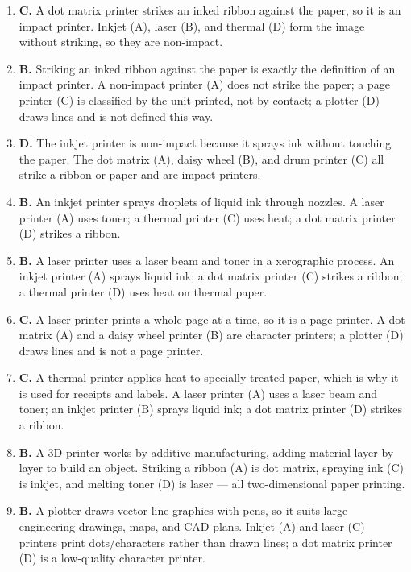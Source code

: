 \begin{enumerate}[label=\textbf{Q\arabic*.}, leftmargin=*]
\item \textbf{C.} A dot matrix printer strikes an inked ribbon against the
  paper, so it is an impact printer. Inkjet (A), laser (B), and thermal (D)
  form the image without striking, so they are non-impact.
\item \textbf{B.} Striking an inked ribbon against the paper is exactly the
  definition of an impact printer. A non-impact printer (A) does not strike
  the paper; a page printer (C) is classified by the unit printed, not by
  contact; a plotter (D) draws lines and is not defined this way.
\item \textbf{D.} The inkjet printer is non-impact because it sprays ink
  without touching the paper. The dot matrix (A), daisy wheel (B), and drum
  printer (C) all strike a ribbon or paper and are impact printers.
\item \textbf{B.} An inkjet printer sprays droplets of liquid ink through
  nozzles. A laser printer (A) uses toner; a thermal printer (C) uses heat;
  a dot matrix printer (D) strikes a ribbon.
\item \textbf{B.} A laser printer uses a laser beam and toner in a
  xerographic process. An inkjet printer (A) sprays liquid ink; a dot matrix
  printer (C) strikes a ribbon; a thermal printer (D) uses heat on thermal
  paper.
\item \textbf{C.} A laser printer prints a whole page at a time, so it is a
  page printer. A dot matrix (A) and a daisy wheel printer (B) are character
  printers; a plotter (D) draws lines and is not a page printer.
\item \textbf{C.} A thermal printer applies heat to specially treated paper,
  which is why it is used for receipts and labels. A laser printer (A) uses
  a laser beam and toner; an inkjet printer (B) sprays liquid ink; a dot
  matrix printer (D) strikes a ribbon.
\item \textbf{B.} A 3D printer works by additive manufacturing, adding
  material layer by layer to build an object. Striking a ribbon (A) is dot
  matrix, spraying ink (C) is inkjet, and melting toner (D) is laser --- all
  two-dimensional paper printing.
\item \textbf{B.} A plotter draws vector line graphics with pens, so it suits
  large engineering drawings, maps, and CAD plans. Inkjet (A) and laser (C)
  printers print dots/characters rather than drawn lines; a dot matrix printer
  (D) is a low-quality character printer.

\end{enumerate}
